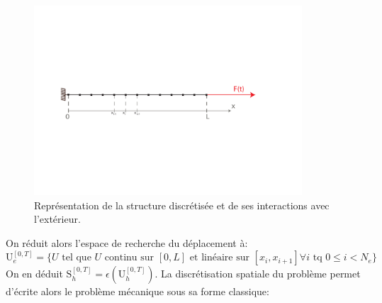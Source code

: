 \documentclass[fleqn]{article}
\begin{document}
\begin{figure}[htbp]
	\begin{center}
		\includegraphics[width=10cm]{figures/poutre_ef}
		\caption{Représentation de la structure discrétisée et de ses interactions avec l'extérieur.}
		\label{PbmBase}
	\end{center}
\end{figure}

On réduit alors l'espace de recherche du déplacement à:
\begin{equation*}
	\mathrm{U}^{\left[ 0, T \right]}_e=\{  U \mbox{ tel que } U \mbox{ continu sur }\left[ 0, L \right] \mbox{ et linéaire sur } \left[ x_i,x_{i+1}\right]\forall i  \mbox{ tq } 0 \leq i < N_e \}
\end{equation*}
On en déduit $\mathrm{S}^{\left[ 0, T \right]}_h=\epsilon(\mathrm{U}^{\left[ 0, T \right]}_h)$.
La discrétisation spatiale du problème permet d'écrite alors le problème mécanique sous sa forme classique:
\end{document}
